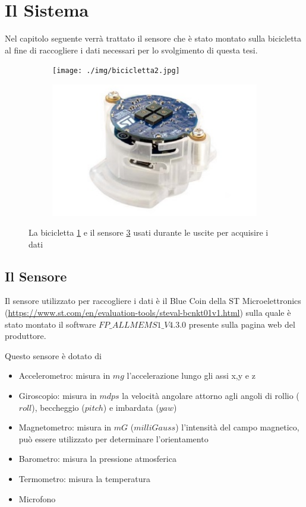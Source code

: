 \documentclass[class=article]{standalone}
\begin{document}
	\section{Il Sistema}
	Nel capitolo seguente verrà trattato il sensore che è stato montato sulla bicicletta al fine di raccogliere i dati necessari per lo svolgimento di questa tesi. 
	
	\begin{figure}[h]
		\begin{subfigure}[h]{0.5\textwidth}
			\centering\texttt{[image: ./img/bicicletta2.jpg]}
			\caption{}
			\label{fig:bici}
		\end{subfigure}
		\begin{subfigure}[h]{0.5\textwidth}
			\centering\includegraphics[width=0.8\linewidth]{./img/bluecoin.jpg}
			\caption{}
			\label{fig:sensore}
		\end{subfigure}
		
		\caption[]{La bicicletta \ref{fig:bici} e il sensore \ref{fig:sensore} usati durante le uscite per acquisire i dati}
	\end{figure}
	
	\subsection{Il Sensore}
	Il sensore utilizzato per raccogliere i dati è il Blue Coin della ST Microelettronics (\url{https://www.st.com/en/evaluation-tools/steval-bcnkt01v1.html}) sulla quale è stato montato il software \(FP\_ALLMEMS1\_V4.3.0\) presente sulla pagina web del produttore.\hfill\break
	
	Questo sensore è dotato di
	\begin{itemize}
		\item Accelerometro: misura in \(mg\) l'accelerazione lungo gli assi x,y e z
		\item Giroscopio: misura in \(mdps\) la velocità angolare attorno agli angoli di rollio (\(roll\)), beccheggio (\(pitch\)) e imbardata (\(yaw\))
		\item Magnetometro: misura in \(mG\) (\(milli Gauss\)) l'intensità del campo magnetico, può essere utilizzato per determinare l'orientamento
		\item Barometro: misura la pressione atmosferica
		\item Termometro: misura la temperatura
		\item Microfono
	\end{itemize}
	
\end{document}
